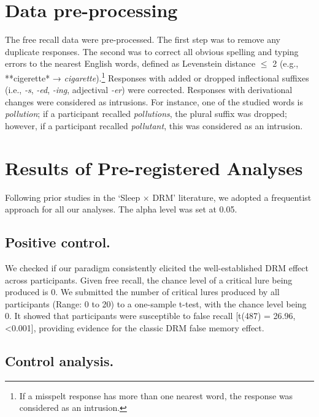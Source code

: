 \documentclass[
]{article}
\begin{document}
\hypertarget{data-pre-processing}{%
\section{Data pre-processing}\label{data-pre-processing}}

The free recall data were pre-processed. The first step was to remove any duplicate responses. The second was to correct all obvious spelling and typing errors to the nearest English words, defined as Levenstein distance \(\leq\) 2 (e.g., **cigerette* → \emph{cigarette}).\footnote{If a misspelt response has more than one nearest word, the response was considered as an intrusion.} Responses with added or dropped inflectional suffixes (i.e., \emph{-s}, \emph{-ed}, \emph{-ing}, adjectival \emph{-er}) were corrected. Responses with derivational changes were considered as intrusions. For instance, one of the studied words is \emph{pollution}; if a participant recalled \emph{pollutions}, the plural suffix was dropped; however, if a participant recalled \emph{pollutant}, this was considered as an intrusion.

\hypertarget{results-of-pre-registered-analyses}{%
\section{Results of Pre-registered Analyses}\label{results-of-pre-registered-analyses}}

Following prior studies in the `Sleep \(\times\) DRM' literature, we adopted a frequentist approach for all our analyses. The alpha level was set at 0.05.

\hypertarget{positive-control.}{%
\subsection{Positive control.}\label{positive-control.}}

We checked if our paradigm consistently elicited the well-established DRM effect across participants. Given free recall, the chance level of a critical lure being produced is 0. We submitted the number of critical lures produced by all participants (Range: 0 to 20) to a one-sample t-test, with the chance level being 0. It showed that participants were susceptible to false recall {[}t(487) = 26.96, \textless0.001{]}, providing evidence for the classic DRM false memory effect.

\hypertarget{control-analysis.}{%
\subsection{Control analysis.}\label{control-analysis.}}
\end{document}
